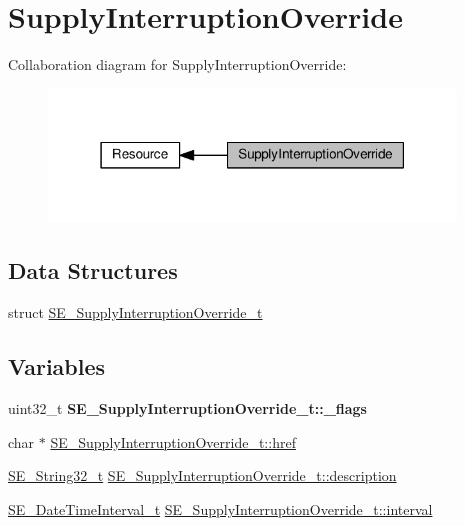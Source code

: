 \hypertarget{group__SupplyInterruptionOverride}{}\section{Supply\+Interruption\+Override}
\label{group__SupplyInterruptionOverride}
Collaboration diagram for Supply\+Interruption\+Override\+:\nopagebreak
\begin{figure}[H]
\begin{center}
\leavevmode
\includegraphics[width=307pt]{group__SupplyInterruptionOverride}
\end{center}
\end{figure}
\subsection*{Data Structures}
\begin{DoxyCompactItemize}
\item 
struct \hyperlink{structSE__SupplyInterruptionOverride__t}{S\+E\+\_\+\+Supply\+Interruption\+Override\+\_\+t}
\end{DoxyCompactItemize}
\subsection*{Variables}
\begin{DoxyCompactItemize}
\item 
\mbox{\label{group__SupplyInterruptionOverride_ga4e14b50d39b0d5bad4c314242adf9e59}} 
uint32\+\_\+t {\bfseries S\+E\+\_\+\+Supply\+Interruption\+Override\+\_\+t\+::\+\_\+flags}
\item 
char $\ast$ \hyperlink{group__SupplyInterruptionOverride_ga70c5ab94b2f05661715eb2a3db266774}{S\+E\+\_\+\+Supply\+Interruption\+Override\+\_\+t\+::href}
\item 
\hyperlink{group__String32_gac9f59b06b168b4d2e0d45ed41699af42}{S\+E\+\_\+\+String32\+\_\+t} \hyperlink{group__SupplyInterruptionOverride_ga767528d74873c66ccdc1a25173c7fab1}{S\+E\+\_\+\+Supply\+Interruption\+Override\+\_\+t\+::description}
\item 
\hyperlink{structSE__DateTimeInterval__t}{S\+E\+\_\+\+Date\+Time\+Interval\+\_\+t} \hyperlink{group__SupplyInterruptionOverride_ga2b48753110e59127cbe7b7a2886512ea}{S\+E\+\_\+\+Supply\+Interruption\+Override\+\_\+t\+::interval}
\end{DoxyCompactItemize}


